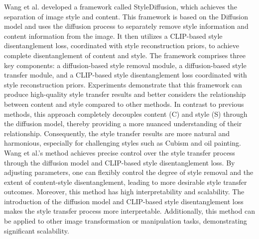 Wang et al.\citep{64wang2023stylediffusion} developed a framework called StyleDiffusion, which achieves the separation of image style and content. This framework is based on the Diffusion model and uses the diffusion process to separately remove style information and content information from the image. It then utilizes a CLIP-based style disentanglement loss, coordinated with style reconstruction priors, to achieve complete disentanglement of content and style. The framework comprises three key components: a diffusion-based style removal module, a diffusion-based style transfer module, and a CLIP-based style disentanglement loss coordinated with style reconstruction priors. Experiments demonstrate that this framework can produce high-quality style transfer results and better considers the relationship between content and style compared to other methods. In contrast to previous methods, this approach completely decouples content (C) and style (S) through the diffusion model, thereby providing a more nuanced understanding of their relationship. Consequently, the style transfer results are more natural and harmonious, especially for challenging styles such as Cubism and oil painting. Wang et al.’s method achieves precise control over the style transfer process through the diffusion model and CLIP-based style disentanglement loss. By adjusting parameters, one can flexibly control the degree of style removal and the extent of content-style disentanglement, leading to more desirable style transfer outcomes. Moreover, this method has high interpretability and scalability. The introduction of the diffusion model and CLIP-based style disentanglement loss makes the style transfer process more interpretable. Additionally, this method can be applied to other image transformation or manipulation tasks, demonstrating significant scalability.

